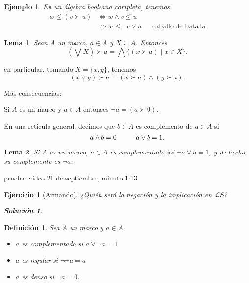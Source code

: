 \documentclass[12pt,letterpaper,titlepage]{article}
\newtheorem*{defn}{Definición}
\newtheorem{exe}{Ejercicio}
\newtheorem*{exa}{Ejemplo}
\newtheorem*{lemma}{Lema}
\theoremstyle{definition}
\newtheorem*{sol}{Solución}
\renewcommand\sup{\vee}
\newcommand\Sup{\bigvee}
\renewcommand\inf{\wedge}
\newcommand\Inf{\bigwedge}
\renewcommand\cal[1]{\mathcal{#1}}
\newcommand\<{\langle}
\renewcommand\>{\rangle}
\begin{document}
\begin{exa}
  En un álgebra booleana completa, tenemos
  \begin{align*}
    w\leq (v\succ u)
    &\iff w\inf v\leq u \\
    &\iff w\leq \neg v\sup u
      && \text{caballo de batalla} 
  \end{align*}
\end{exa}

\begin{lemma}
  Sean $A$ un marco, $a\in A$ y $X\subseteq A$.
  Entonces
  \[
    (\Sup X)\succ a = \Inf\{(x\succ a) \mid x\in X\}
  .\]
\end{lemma}
en particular, tomando $X=\{x,y\}$, tenemos
\[
  (x\sup y)\succ a = (x\succ a)\inf(y\succ a)
.\]

Más consecuencias:

Si $A$ es un marco y $a\in A$ entonces $\neg a = (a\succ 0)$.

En una retícula general, decimos que $b\in A$ es
complemento de $a\in A$ si
\[
  a\inf b = 0 \hspace{10mm} a\sup b = 1
.\]

\begin{lemma}
  Si $A$ es un marco, $a\in A$ es complementado ssi $\neg a \sup
a = 1$, y de hecho su complemento es $\neg a$.
\end{lemma}
prueba: video 21 de septiembre, minuto 1:13

\begin{exe}[Armando]
  ¿Quién será la negación y la implicación en $\cal L S$?
  \begin{sol}
      
  \end{sol}
\end{exe}

\begin{defn}
  Sea $A$ un marco y $a\in A$.
  \begin{itemize}
    \item $a$ es complementado si $a\sup\neg a = 1$
    \item $a$ es regular si $\neg\neg a = a$
    \item $a$ es denso si $\neg a = 0$.
  \end{itemize}
\end{defn}
\end{document}
